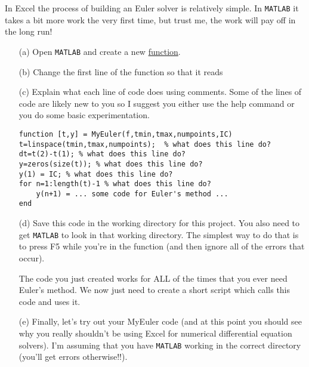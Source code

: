 \begin{problem}
    In Excel the process of building an Euler solver is relatively simple.  In \texttt{MATLAB}
it takes a bit more work the very first time, but trust me, the work will pay off in the
long run!
\begin{enumerate}
    \item[(a)] Open \texttt{MATLAB} and create a new \underline{function}.  
    \item[(b)] Change the first line of the function so that it reads \\
    \item[(c)] Explain what each line of code does using comments. Some of the lines of
        code are likely new to you so I suggest you either use the help command or you do
        some basic experimentation.
\begin{lstlisting}
function [t,y] = MyEuler(f,tmin,tmax,numpoints,IC)
t=linspace(tmin,tmax,numpoints);  % what does this line do?
dt=t(2)-t(1); % what does this line do?
y=zeros(size(t)); % what does this line do?
y(1) = IC; % what does this line do?
for n=1:length(t)-1 % what does this line do?
    y(n+1) = ... some code for Euler's method ...
end
\end{lstlisting}
    \item[(d)] Save this code in the working directory for this project.  You also need to
        get \texttt{MATLAB} to look in that working directory.  The simplest way to do
        that is to press F5 while you're in the  function (and then ignore all of
        the errors that occur).  

        The code you just created works for ALL of the times that you ever need Euler's
        method.  We now just need to create a short script which calls this code and uses
        it.
    \item[(e)] Finally, let's try out your MyEuler code (and at this point you should see why
        you really shouldn't be using Excel for numerical differential equation solvers).
        I'm assuming that you have \texttt{MATLAB} working in the correct directory
        (you'll get errors otherwise!!).  


\end{enumerate}
\end{problem}
